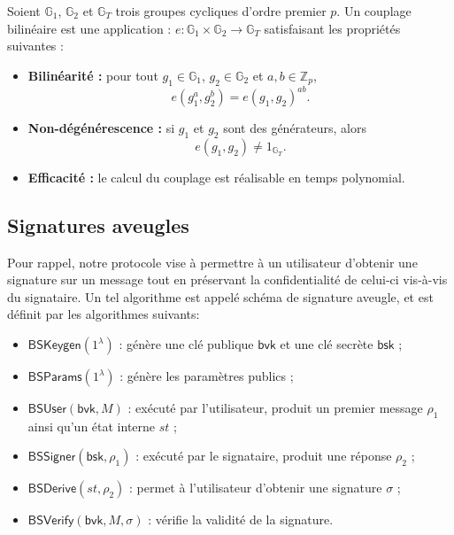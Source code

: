 \documentclass[10pt,a4paper]{article}
\theoremstyle{definition}
\theoremstyle{plain}
\theoremstyle{remark}
\begin{document}
Soient $\mathbb{G}_1$, $\mathbb{G}_2$ et $\mathbb{G}_T$ trois groupes
cycliques d'ordre premier $p$. Un couplage bilinéaire est une application :
$
e:\mathbb{G}_1\times\mathbb{G}_2
\rightarrow
\mathbb{G}_T
$
satisfaisant les propriétés suivantes :

\begin{itemize}
    \item \textbf{Bilinéarité :}
    pour tout $g_1\in\mathbb{G}_1$, $g_2\in\mathbb{G}_2$ et
    $a,b\in\mathbb{Z}_p$,
    \[
    e(g_1^a,g_2^b)=e(g_1,g_2)^{ab}.
    \]

    \item \textbf{Non-dégénérescence :}
    si $g_1$ et $g_2$ sont des générateurs,
    alors
    \[
    e(g_1,g_2)\neq 1_{\mathbb{G}_T}.
    \]

    \item \textbf{Efficacité :}
    le calcul du couplage est réalisable en temps polynomial.
\end{itemize}

\subsection{Signatures aveugles}\label{sec:algo}

Pour rappel, notre protocole vise à permettre à un utilisateur 
d'obtenir une signature sur un message tout en préservant la 
confidentialité de celui-ci vis-à-vis du signataire.
Un tel algorithme est appelé schéma de signature aveugle, 
et est définit par les algorithmes suivants:

\begin{itemize}
    \item $\mathsf{BSKeygen}(1^\lambda)$ :
    génère une clé publique $\mathsf{bvk}$ et une clé secrète
    $\mathsf{bsk}$ ;

    \item $\mathsf{BSParams}(1^\lambda)$ :
    génère les paramètres publics ;

    \item $\mathsf{BSUser}(\mathsf{bvk},M)$ :
    exécuté par l'utilisateur, produit un premier message
    $\rho_1$ ainsi qu'un état interne $st$ ;

    \item $\mathsf{BSSigner}(\mathsf{bsk},\rho_1)$ :
    exécuté par le signataire, produit une réponse $\rho_2$ ;

    \item $\mathsf{BSDerive}(st,\rho_2)$ :
    permet à l'utilisateur d'obtenir une signature $\sigma$ ;

    \item $\mathsf{BSVerify}(\mathsf{bvk},M,\sigma)$ :
    vérifie la validité de la signature.
\end{itemize}
\end{document}
